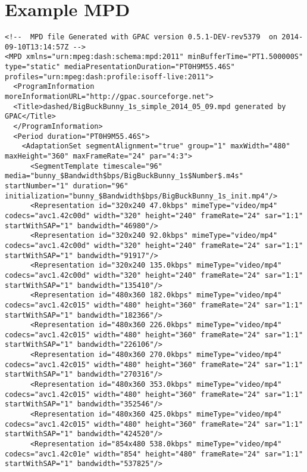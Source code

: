 \chapter{Example MPD} \label{chap:examplempd}

\lstset{language=XML}

\begin{lstlisting}
<!--  MPD file Generated with GPAC version 0.5.1-DEV-rev5379  on 2014-09-10T13:14:57Z -->
<MPD xmlns="urn:mpeg:dash:schema:mpd:2011" minBufferTime="PT1.500000S" type="static" mediaPresentationDuration="PT0H9M55.46S" profiles="urn:mpeg:dash:profile:isoff-live:2011">
  <ProgramInformation moreInformationURL="http://gpac.sourceforge.net">
  <Title>dashed/BigBuckBunny_1s_simple_2014_05_09.mpd generated by GPAC</Title>
  </ProgramInformation>
  <Period duration="PT0H9M55.46S">
    <AdaptationSet segmentAlignment="true" group="1" maxWidth="480" maxHeight="360" maxFrameRate="24" par="4:3">
      <SegmentTemplate timescale="96" media="bunny_$Bandwidth$bps/BigBuckBunny_1s$Number$.m4s" startNumber="1" duration="96" initialization="bunny_$Bandwidth$bps/BigBuckBunny_1s_init.mp4"/>
      <Representation id="320x240 47.0kbps" mimeType="video/mp4" codecs="avc1.42c00d" width="320" height="240" frameRate="24" sar="1:1" startWithSAP="1" bandwidth="46980"/>
      <Representation id="320x240 92.0kbps" mimeType="video/mp4" codecs="avc1.42c00d" width="320" height="240" frameRate="24" sar="1:1" startWithSAP="1" bandwidth="91917"/>
      <Representation id="320x240 135.0kbps" mimeType="video/mp4" codecs="avc1.42c00d" width="320" height="240" frameRate="24" sar="1:1" startWithSAP="1" bandwidth="135410"/>
      <Representation id="480x360 182.0kbps" mimeType="video/mp4" codecs="avc1.42c015" width="480" height="360" frameRate="24" sar="1:1" startWithSAP="1" bandwidth="182366"/>
      <Representation id="480x360 226.0kbps" mimeType="video/mp4" codecs="avc1.42c015" width="480" height="360" frameRate="24" sar="1:1" startWithSAP="1" bandwidth="226106"/>
      <Representation id="480x360 270.0kbps" mimeType="video/mp4" codecs="avc1.42c015" width="480" height="360" frameRate="24" sar="1:1" startWithSAP="1" bandwidth="270316"/>
      <Representation id="480x360 353.0kbps" mimeType="video/mp4" codecs="avc1.42c015" width="480" height="360" frameRate="24" sar="1:1" startWithSAP="1" bandwidth="352546"/>
      <Representation id="480x360 425.0kbps" mimeType="video/mp4" codecs="avc1.42c015" width="480" height="360" frameRate="24" sar="1:1" startWithSAP="1" bandwidth="424520"/>
      <Representation id="854x480 538.0kbps" mimeType="video/mp4" codecs="avc1.42c01e" width="854" height="480" frameRate="24" sar="1:1" startWithSAP="1" bandwidth="537825"/>

\end{lstlisting}
